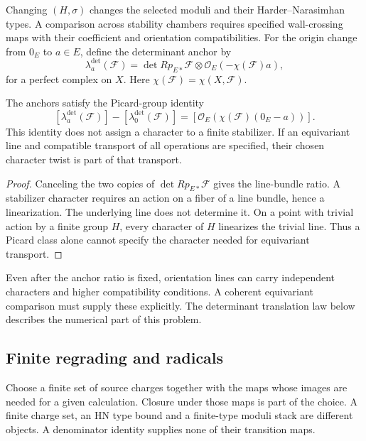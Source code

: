 \begin{definition}
\label{def:polarization-origin-dependence}
Changing $(H,\sigma)$ changes the selected moduli and their
Harder--Narasimhan types.  A comparison across stability chambers
requires specified wall-crossing maps with their coefficient and
orientation compatibilities.  For the origin change from $0_E$ to
$a\in E$, define the determinant anchor by
\[
\lambda_a^{\det}(\mathcal F)=
\det Rp_{E*}\mathcal F\otimes\mathcal O_E(-\chi(\mathcal F)a),
\]
for a perfect complex on $X$.  Here
$\chi(\mathcal F)=\chi(X,\mathcal F)$.
\end{definition}

\begin{proposition}
\label{prop:elliptic-origin-independence-character}
The anchors satisfy the Picard-group identity
\[
[\lambda_a^{\det}(\mathcal F)]-
[\lambda_0^{\det}(\mathcal F)]
=[\mathcal O_E(\chi(\mathcal F)(0_E-a))].
\]
This identity does not assign a character to a finite stabilizer.
If an equivariant line and compatible transport of all operations are
specified, their chosen character twist is part of that transport.
\end{proposition}

\begin{proof}
Canceling the two copies of $\det Rp_{E*}\mathcal F$ gives the
line-bundle ratio.  A stabilizer character requires an action on a
fiber of a line bundle, hence a linearization.  The underlying line does not determine it.  On a point with
trivial action by a finite group $H$, every character of $H$
linearizes the trivial line.  Thus a Picard class alone cannot specify the
character needed for equivariant transport.
\end{proof}

Even after the anchor ratio is fixed, orientation lines can carry
independent characters and higher compatibility conditions.
A coherent equivariant comparison must supply these explicitly.
The determinant translation law below describes the numerical
part of this problem.

\subsection{Finite regrading and radicals}

\begin{remark}
\label{rem:finite-charge-window-verification}
Choose a finite set of source charges together with the maps whose
images are needed for a given calculation.  Closure under those maps
is part of the choice.  A finite charge set, an HN type bound and a
finite-type moduli stack are different objects.  A denominator
identity supplies none of their transition maps.
\end{remark}

